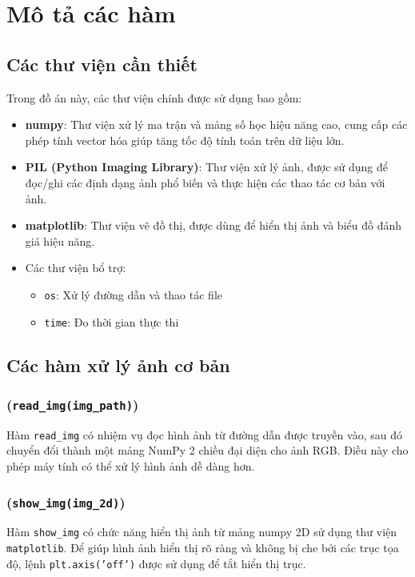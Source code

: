 \section{Mô tả các hàm}
\subsection{Các thư viện cần thiết}
Trong đồ án này, các thư viện chính được sử dụng bao gồm:
\begin{itemize}
	\item \textbf{numpy}: Thư viện xử lý ma trận và mảng số học hiệu năng cao, cung cấp các phép tính vector hóa giúp tăng tốc độ tính toán trên dữ liệu lớn.
	\item \textbf{PIL (Python Imaging Library)}: Thư viện xử lý ảnh, được sử dụng để đọc/ghi các định dạng ảnh phổ biến và thực hiện các thao tác cơ bản với ảnh.
	\item \textbf{matplotlib}: Thư viện vẽ đồ thị, được dùng để hiển thị ảnh và biểu đồ đánh giá hiệu năng.

	\item Các thư viện bổ trợ:
	      \begin{itemize}
		      \item \texttt{os}: Xử lý đường dẫn và thao tác file
		      \item \texttt{time}: Đo thời gian thực thi
	      \end{itemize}
\end{itemize}

\subsection{Các hàm xử lý ảnh cơ bản}
\subsubsection{(\texttt{read\_img(img\_path)})}
Hàm \texttt{read\_img} có nhiệm vụ đọc hình ảnh từ đường dẫn được truyền vào, sau đó chuyển đổi thành một mảng NumPy 2 chiều đại diện cho ảnh RGB. Điều này cho phép máy tính có thể xử lý hình ảnh dễ dàng hơn.

\subsubsection{(\texttt{show\_img(img\_2d)})}
Hàm \texttt{show\_img} có chức năng hiển thị ảnh từ mảng numpy 2D sử dụng thư viện \texttt{matplotlib}. Để giúp hình ảnh hiển thị rõ ràng và không bị che bởi các trục tọa độ, lệnh \texttt{plt.axis('off')} được sử dụng để tắt hiển thị trục.

